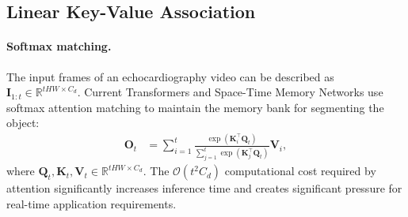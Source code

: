 \subsection{Linear Key-Value Association}
    \label{subsec:lkva}
\paragraph{Softmax matching.}
The input frames of an echocardiography video can be described as $\boldsymbol{I}_{1:t} \in \mathbb{R}^{tHW \times C_d}$. Current Transformers and Space-Time Memory Networks \cite{cheng2021rethinkingspacetimenetworksimproved,cheng2022xmemlongtermvideoobject,bekuzarov2023xmemproductionlevelvideosegmentation,cheng2024puttingobjectvideoobject} use softmax attention matching to maintain the memory bank for segmenting the object:
\begin{equation}
    \begin{aligned}
		\boldsymbol{O}_t &= \sum_{i=1}^{t} \frac{ \exp(\boldsymbol{K}_i^{\intercal} \boldsymbol{Q}_t)}{\sum_{j=1}^{t} \exp(\boldsymbol{K}_j^{\intercal} \boldsymbol{Q}_t)} \boldsymbol{V}_i,
    \end{aligned}
	\label{eq:softmax_attention}
\end{equation}
where $\boldsymbol{Q}_t, \boldsymbol{K}_t, \boldsymbol{V}_t \in \mathbb{R}^{tHW \times C_d}$. 
The $\mathcal{O}(t^{2} C_d)$ computational cost required by attention significantly increases inference time and creates significant pressure for real-time application requirements.
%
